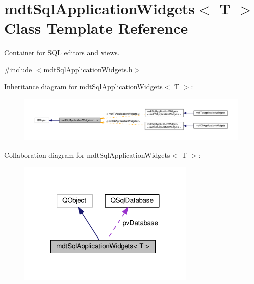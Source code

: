\hypertarget{classmdt_sql_application_widgets}{\section{mdt\-Sql\-Application\-Widgets$<$ T $>$ Class Template Reference}
\label{classmdt_sql_application_widgets}
}


Container for S\-Q\-L editors and views.  




{\ttfamily \#include $<$mdt\-Sql\-Application\-Widgets.\-h$>$}



Inheritance diagram for mdt\-Sql\-Application\-Widgets$<$ T $>$\-:\nopagebreak
\begin{figure}[H]
\begin{center}
\leavevmode
\includegraphics[width=350pt]{classmdt_sql_application_widgets__inherit__graph}
\end{center}
\end{figure}


Collaboration diagram for mdt\-Sql\-Application\-Widgets$<$ T $>$\-:\nopagebreak
\begin{figure}[H]
\begin{center}
\leavevmode
\includegraphics[width=240pt]{classmdt_sql_application_widgets__coll__graph}
\end{center}
\end{figure}
